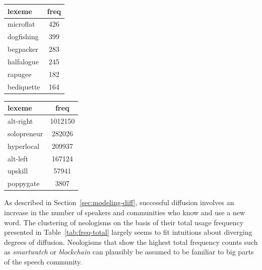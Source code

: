\documentclass[
  a4paper,
  abstract=on,
  captions=tableabove
  ]{scrartcl}
\begin{document}
\begin{table}
    \begin{subtable}{.45\linewidth}
      \label{subtab:freq-total-min}
      \centering
      \begin{tabular}{l S[table-format=3]}
        \toprule
        lexeme               & {freq} \\
        \midrule
        microflat            & 426    \\
        dogfishing           & 399    \\
        begpacker            & 283    \\
        halfalogue           & 245    \\
        rapugee              & 182    \\
        bediquette           & 164    \\
        \bottomrule
      \end{tabular}
    \end{subtable}
    \hfill
    \begin{subtable}{.45\linewidth}
      \label{subtab:freq-total-cases}
      \centering
      \begin{tabular}{l S[table-format=7]}
        \toprule
        lexeme       & {freq}  \\
        \midrule
        alt-right    & 1012150 \\
        solopreneur  & 282026  \\
        hyperlocal   & 209937  \\
        alt-left     & 167124  \\
        upskill      & 57941   \\
        poppygate    & 3807    \\
        \bottomrule
      \end{tabular}
    \end{subtable}
  \end{table}

  As described in Section~\ref{sec:modeling-diff}, successful diffusion involves an increase in the number of speakers and communities who know and use a new word. The clustering of neologisms on the basis of their total usage frequency presented in Table~\ref{tab:freq-total} largely seems to fit intuitions about diverging degrees of diffusion. Neologisms that show the highest total frequency counts such as \emph{smartwatch} or \emph{blockchain} can plausibly be assumed to be familiar to big parts of the speech community.
\end{document}
